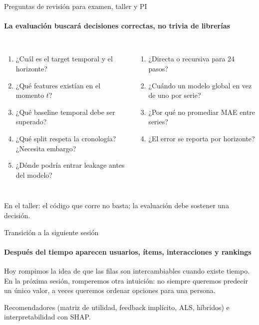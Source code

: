 \documentclass[aspectratio=169,11pt]{beamer}  %
\begin{document}
\begin{frame}{Preguntas de revisión para examen, taller y PI}
\framesubtitle{La evaluación buscará decisiones correctas, no trivia de librerías}
\begin{columns}[T]
\begin{enumerate}\small
\item ¿Cuál es el target temporal y el horizonte?
\item ¿Qué features existían en el momento $t$?
\item ¿Qué baseline temporal debe ser superado?
\item ¿Qué split respeta la cronología? ¿Necesita embargo?
\item ¿Dónde podría entrar leakage antes del modelo?
\end{enumerate}
\begin{enumerate}\small\setcounter{enumi}{5}
\item ¿Directa o recursiva para 24 pasos?
\item ¿Cuándo un modelo global en vez de uno por serie?
\item ¿Por qué no promediar MAE entre series?
\item ¿El error se reporta por horizonte?
\end{enumerate}
\end{columns}
\vspace{4pt}
{\small En el taller: el código que corre no basta; la evaluación debe sostener una decisión.\par}
\end{frame}

\begin{frame}{Transición a la siguiente sesión}
\framesubtitle{Después del tiempo aparecen usuarios, ítems, interacciones y rankings}
\begin{center}\large
Hoy rompimos la idea de que las filas son intercambiables cuando existe tiempo.\\[0.8em]
En la próxima sesión, romperemos otra intuición: no siempre queremos predecir un único valor, a veces queremos ordenar opciones para una persona.
\end{center}
\begin{keybox}[Sesión 4]
\small Recomendadores (matriz de utilidad, feedback implícito, ALS, híbridos) e interpretabilidad con SHAP.
\end{keybox}
\end{frame}
\end{document}
